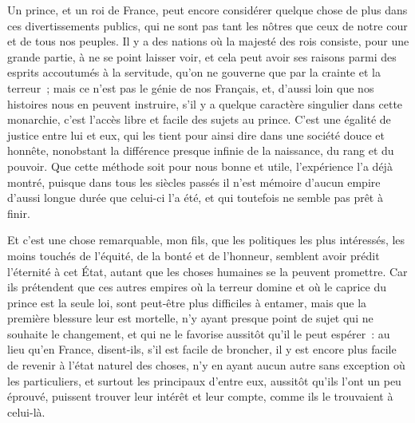 \documentclass[french,twoside]{book} %
\begin{document}
Un prince, et un roi de France, peut encore considérer quelque chose de plus dans ces divertissements publics, qui ne sont pas tant les nôtres que ceux de notre cour et de tous nos peuples. Il y a des nations où la majesté des rois consiste, pour une grande partie, à ne se point laisser voir, et cela peut avoir ses raisons parmi des esprits accoutumés à la servitude, qu’on ne gouverne que par la crainte et la terreur ; mais ce n’est pas le génie de nos Français, et, d’aussi loin que nos histoires nous en peuvent instruire, s’il y a quelque caractère singulier dans cette monarchie, c’est l’accès libre et facile des sujets au prince. C’est une égalité de justice entre lui et eux, qui les tient pour ainsi dire dans une société douce et honnête, nonobstant la différence presque infinie de la naissance, du rang et du pouvoir. Que cette méthode soit pour nous bonne et utile, l’expérience l’a déjà montré, puisque dans tous les siècles passés il n’est mémoire d’aucun empire d’aussi longue durée que celui-ci l’a été, et qui toutefois ne semble pas prêt à finir.\par
Et c’est une chose remarquable, mon fils, que les politiques les plus intéressés, les moins touchés de l’équité, de la bonté et de l’honneur, semblent avoir prédit l’éternité à cet État, autant que les choses humaines se la peuvent promettre. Car ils prétendent que ces autres empires où la terreur domine et où le caprice du prince est la seule loi, sont peut-être plus difficiles à entamer, mais que la première blessure leur est mortelle, n’y ayant presque point de sujet qui ne souhaite le changement, et qui ne le favorise aussitôt qu’il le peut espérer : au lieu qu’en France, disent-ils, s’il est facile de broncher, il y est encore plus facile de revenir à l’état naturel des choses, n’y en ayant aucun autre sans exception où les particuliers, et surtout les principaux d’entre eux, aussitôt qu’ils l’ont un peu éprouvé, puissent trouver leur intérêt et leur compte, comme ils le trouvaient à celui-là.\par
\end{document}
